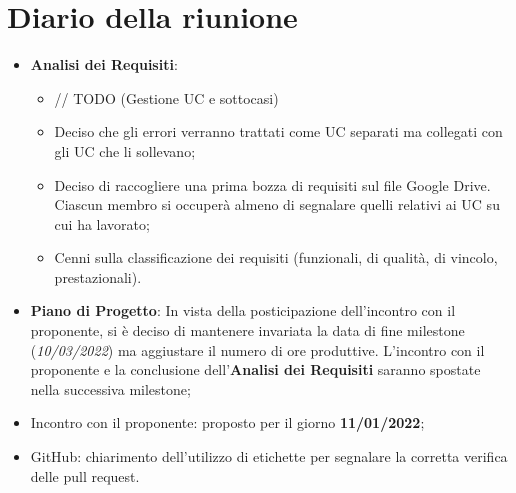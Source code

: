 \section{Diario della riunione}
\begin{itemize}
  \item \textbf{Analisi dei Requisiti}: 
  \begin{itemize}
    \item // TODO (Gestione UC e sottocasi)
    \item Deciso che gli errori verranno trattati come UC separati ma collegati con gli UC che li sollevano;
    \item Deciso di raccogliere una prima bozza di requisiti sul file Google Drive. Ciascun membro si occuperà almeno di segnalare quelli relativi ai UC su cui ha lavorato;
    \item Cenni sulla classificazione dei requisiti (funzionali, di qualità, di vincolo, prestazionali).
  \end{itemize}
  \item \textbf{Piano di Progetto}: In vista della posticipazione dell'incontro con il proponente, si è deciso di mantenere invariata la data di fine milestone (\textit{10/03/2022}) ma aggiustare il numero di ore produttive. L'incontro con il proponente e la conclusione dell'\textbf{Analisi dei Requisiti} saranno spostate nella successiva milestone;
  \item Incontro con il proponente: proposto per il giorno \textbf{11/01/2022};
  \item GitHub: chiarimento dell'utilizzo di etichette per segnalare la corretta verifica delle pull request.  
\end{itemize}
